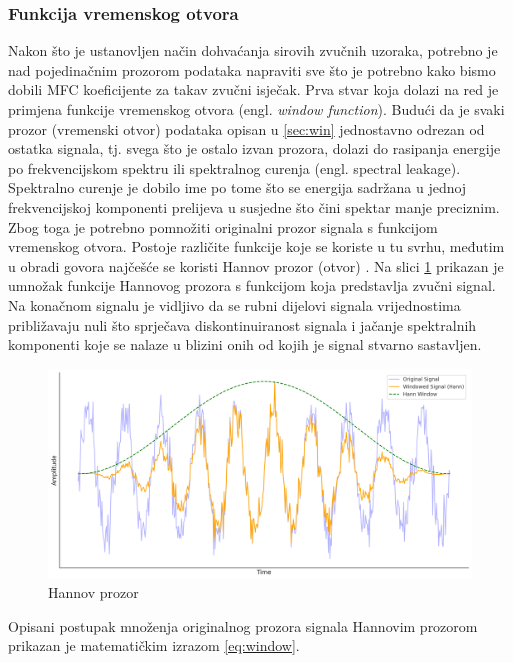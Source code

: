 \subsubsection{Funkcija vremenskog otvora}
Nakon što je ustanovljen način dohvaćanja sirovih zvučnih uzoraka, potrebno je
nad pojedinačnim prozorom podataka napraviti sve što je potrebno kako bismo
dobili MFC koeficijente za takav zvučni isječak. Prva stvar koja dolazi na red 
je primjena funkcije vremenskog otvora (engl. \textit{window function}). Budući da je svaki
prozor (vremenski otvor) podataka opisan u \ref{sec:win} jednostavno odrezan od ostatka
signala, tj. svega što je ostalo izvan prozora, dolazi do rasipanja energije po
frekvencijskom spektru ili spektralnog curenja (engl. spectral leakage). Spektralno curenje
je dobilo ime po tome što se energija sadržana u jednoj frekvencijskoj komponenti prelijeva
u susjedne što čini spektar manje preciznim.
Zbog toga je potrebno pomnožiti originalni prozor signala s funkcijom vremenskog otvora. Postoje
različite funkcije koje se koriste u tu svrhu, međutim u obradi govora najčešće se koristi
Hannov prozor (otvor) \cite{windowing}.
Na slici \ref{pic:hann} prikazan je umnožak funkcije Hannovog prozora s funkcijom
koja predstavlja zvučni signal. Na konačnom signalu je vidljivo da se rubni dijelovi
signala vrijednostima približavaju nuli što sprječava diskontinuiranost signala i jačanje
spektralnih komponenti koje se nalaze u blizini onih od kojih je signal stvarno sastavljen.

\begin{figure}[htb]
    \centering
    \includegraphics[width=0.9\linewidth]{Chapters/struktura_sustava/generiranje_znacajki/hann.png} 
    \caption{Hannov prozor}
    \label{pic:hann}
\end{figure}

Opisani postupak množenja originalnog prozora signala Hannovim prozorom prikazan je 
matematičkim izrazom \ref{eq:window}.

